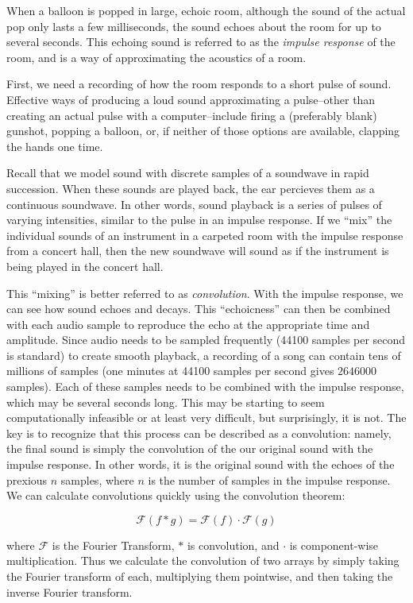When a balloon is popped in large, echoic room, although the sound of the actual pop only lasts a few milliseconds, the sound echoes about the room for up to several seconds.
This echoing sound is referred to as the \emph{impulse response} of the room, and is a way of approximating the acoustics of a room.

First, we need a recording of how the room responds to a short pulse of sound.
Effective ways of producing a loud sound approximating a pulse--other than creating an actual pulse with a computer--include firing a (preferably blank) gunshot, popping a balloon, or, if neither of those options are available, clapping the hands one time.

Recall that we model sound with discrete samples of a soundwave in rapid succession.
When these sounds are played back, the ear percieves them as a continuous soundwave.
In other words, sound playback is a series of pulses of varying intensities, similar to the pulse in an impulse response.
If we ``mix'' the individual sounds of an instrument in a carpeted room with the impulse response from a concert hall, then the new soundwave will sound as if the instrument is being played in the concert hall.

This ``mixing'' is better referred to as \emph{convolution}. With the impulse response, we can see how sound echoes and decays.  This ``echoicness'' can then be combined with each audio sample to reproduce the echo at the appropriate time and amplitude.
Since audio needs to be sampled frequently (44100 samples per second is standard) to create smooth playback, a recording of a song can contain tens of millions of samples (one minutes at 44100 samples per second gives $2646000$ samples).
Each of these samples needs to be combined with the impulse response, which may be several seconds long.
This may be starting to seem computationally infeasible or at least very difficult, but surprisingly, it is not.
The key is to recognize that this process can be described as a convolution: namely, the final sound is simply the convolution of the our original sound with the impulse response.
In other words, it is the original sound with the echoes of the prexious $n$ samples, where $n$ is the number of samples in the impulse response.
We can calculate convolutions quickly using the convolution theorem:

\[\mathcal{F}(f \ast g) = \mathcal{F}(f)\cdot\mathcal{F}(g)\]

where $\mathcal{F}$ is the Fourier Transform, $\ast$ is convolution, and $\cdot$ is component-wise multiplication.
Thus we calculate the convolution of two arrays by simply taking the Fourier transform of each, multiplying them pointwise, and then taking the inverse Fourier transform.

